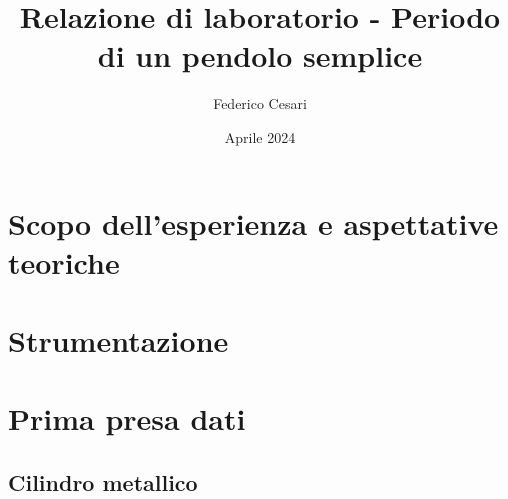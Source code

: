 \documentclass{article}
\title{Relazione di laboratorio - Periodo di un pendolo semplice}
\author{Federico Cesari}
\date{Aprile 2024}
\begin{document}
	
	\tableofcontents
	
	\newpage
	\section*{Scopo dell’esperienza e aspettative teoriche}
	\section*{Strumentazione}
	
	\newpage
	\section{Prima presa dati}
		\subsection{Cilindro metallico}
\end{document}
